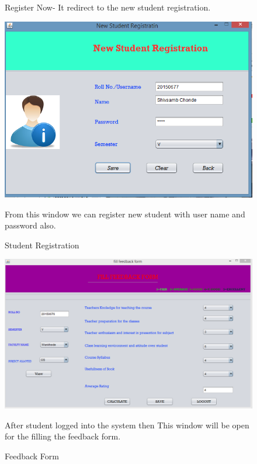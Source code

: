 \documentclass[12 pt,a4paper]{report}
\begin{document}
\begin{center}
\begin{figure}[ht]
\begin{center}
{Register Now- It redirect to the new student registration.}
\end{center}
\end{figure}
\begin{figure}[ht]
\begin{center}
\includegraphics[scale=.7]{studreg.png}\\
\caption{Student Registration}
\vspace{0.2 cm}
\justify
{From this window we can register new student with user name and password also.}
\end{center}
\end{figure}
\begin{figure}[ht]
\begin{center}
\includegraphics[scale=.5]{feedback.png}\\
\caption{Feedback Form}
\vspace{0.2 cm}
\justify
{After student logged into the system then This window will be open for the filling the feedback form.}
\end{center}
\end{figure}




\end{center}
\end{document}
